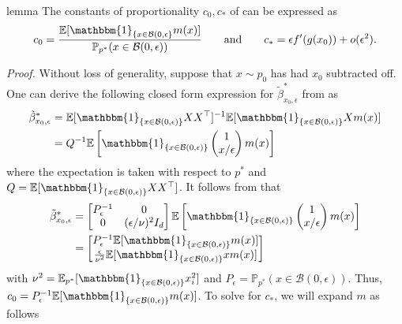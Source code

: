 \documentclass[11pt]{article}
\begin{document}
\begin{restatable}{lemma}{} \label{lemma: constant of prop}
    The constants of proportionality $c_0, c_*$ of  can be expressed as \[c_0 = \frac{\mathbb{E}[\mathbbm{1}_{\{x \in \mathcal{B}(0, \epsilon\}}m(x)]}{\mathbb{P}_{p^*}(x \in \mathcal{B}(0, \epsilon))} \qquad \text{and} \qquad c_* = \epsilon f'(g(x_0))+ o(\epsilon^2).\] 
\end{restatable}
\noindent \textit{Proof.} Without loss of generality, suppose that $x \sim p_0$ has had $x_0$ subtracted off. One can derive the following closed form expression for $\tilde \beta^*_{x_0, \epsilon}$ from  as
\begin{align*}
    \tilde \beta^*_{x_0, \epsilon} &= \mathbb{E}[\mathbbm{1}_{\{x \in \mathcal{B}(0, \epsilon)\}}XX^{\top}]^{-1}\mathbb{E}[\mathbbm{1}_{\{x \in \mathcal{B}(0, \epsilon)\}}Xm(x)] \\
    &= Q^{-1}\mathbb{E}\left[\mathbbm{1}_{\{x \in \mathcal{B}(0, \epsilon)\}}\begin{pmatrix}
        1 \\ x/\epsilon
    \end{pmatrix}m(x)\right]
\end{align*}
where the expectation is taken with respect to $p^*$ and $Q = \mathbb{E}[\mathbbm{1}_{\{x \in \mathcal{B}(0, \epsilon)\}}XX^{\top}]$. It follows from  that
\begin{align*}
    \tilde \beta^*_{x_0, \epsilon} &= \begin{bmatrix}
         P_\epsilon^{-1} & 0 \\
         0 & (\epsilon/\nu)^{2}I_d
    \end{bmatrix}\mathbb{E}\left[\mathbbm{1}_{\{x \in \mathcal{B}(0, \epsilon)\}}\begin{pmatrix}
        1 \\ x/\epsilon
    \end{pmatrix} m(x)\right] \\
    &= \begin{bmatrix}
        P_\epsilon^{-1} \mathbb{E}[\mathbbm{1}_{\{x \in \mathcal{B}(0, \epsilon)\}}m(x)] \\
        \frac{\epsilon}{\nu^2}\mathbb{E}[\mathbbm{1}_{\{x \in \mathcal{B}(0, \epsilon)\}} xm(x)]
    \end{bmatrix}
\end{align*}
with $\nu^2 = \mathbb{E}_{p^*}[\mathbbm{1}_{\{x \in \mathcal{B}(0, \epsilon)\}}x_i^2]$ and $P_{\epsilon} = \mathbb{P}_{p^*}(x \in \mathcal{B}(0, \epsilon)).$ Thus, $c_0 = P_\epsilon^{-1} \mathbb{E}[\mathbbm{1}_{\{x \in \mathcal{B}(0, \epsilon)\}}m(x)]$. To solve for $c_*$, we will expand $m$ as follows
\end{document}
